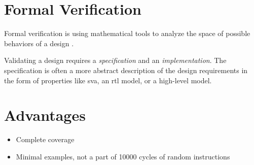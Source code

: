 %
%
%
%
%
%
%
%
%
%
%
%
%

\section{Formal Verification}


Formal verification is using mathematical tools to analyze the space of possible behaviors of a design \cite{seligmanFormalVerificationEssential2015}.

Validating a design requires a \textit{specification} and an \textit{implementation}. The specification is often a more abstract description of the design requirements in the form of properties like \acrfull{sva}, an \acrshort{rtl} model, or a high-level model\cite[p. 26]{seligmanFormalVerificationEssential2015}. 

\section{Advantages}

\begin{itemize}
    \item Complete coverage
    \item Minimal examples, not a part of 10000 cycles of random instructions
\end{itemize}



